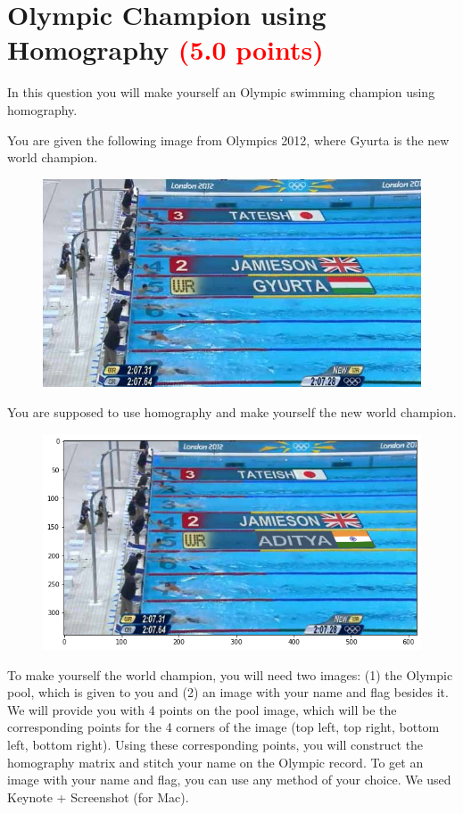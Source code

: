 \documentclass[answers]{exam}
\newcommand{\mypoints}[1]{\textcolor{red}{(#1 points)}}
\begin{document}
\newpage
\section{Olympic Champion using Homography \mypoints{5.0}}

In this question you will make yourself an Olympic swimming champion using homography.

You are given the following image from Olympics 2012, where Gyurta is the new world champion.

\begin{figure}[H]
    \centering
    \includegraphics[width=0.9\linewidth]{Images/pool-vfx.jpg}
\end{figure}

You are supposed to use homography and make yourself the new world champion.

\begin{figure}[H]
    \centering
    \includegraphics[width=\linewidth]{Images/question_4.png}
\end{figure}

To make yourself the world champion, you will need two images: (1) the Olympic pool, which is given to you and (2) an image with your name and flag besides it. We will provide you with 4 points on the pool image, which will be the corresponding points for the 4 corners of the image (top left, top right, bottom left, bottom right). Using these corresponding points, you will construct the homography matrix and stitch your name on the Olympic record. To get an image with your name and flag, you can use any method of your choice. We used Keynote + Screenshot (for Mac). 
\end{document}
